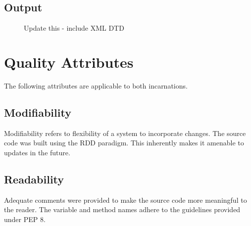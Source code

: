     \subsection{Output}
    \begin{figure}[h!]
      \centering
      \caption{Update this - include XML DTD}
      \label{fig:XML output}
    \end{figure}

\section{Quality Attributes}
  \begin{flushleft}
    The following attributes are applicable to both incarnations.
  \end{flushleft}
  \subsection{Modifiability}
    \begin{flushleft}
      Modifiability refers to flexibility of a system to incorporate changes. The source code was built using the RDD paradigm. This inherently makes it amenable to updates in the future.
    \end{flushleft}

  \subsection{Readability}
    \begin{flushleft}
      Adequate comments were provided to make the source code more meaningful to the reader. The variable and method names adhere to the guidelines provided under PEP 8. 
    \end{flushleft}

